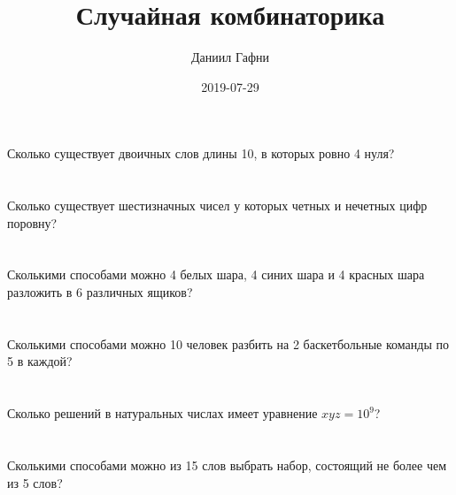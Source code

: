 \documentclass{article}%
\title{Случайная комбинаторика}%
\author{Даниил Гафни}%
\date{2019{-}07{-}29}%
\begin{document}
%
\normalsize%
\maketitle%
\section{}%
\label{sec:}%
Сколько существует двоичных слов длины 10, в которых ровно 4 нуля?%
%
\iffalse%
Автор: Ираклий Гагуа%
Дата: 07{-}01{-}2011%
Название: None%
Подсказка: \textbackslash{}\textbackslash{}%
nan%
\fi

%
\section{}%
\label{sec:}%
Сколько существует шестизначных чисел у которых четных и нечетных цифр
поровну?%
%
\iffalse%
Автор: 25 школа%
Дата: 01{-}07{-}2017%
Название: None%
Подсказка: \textbackslash{}\textbackslash{}%
nan%
\fi

%
\section{}%
\label{sec:}%
Сколькими способами можно 4 белых шара, 4 синих шара и 4 красных шара
разложить в 6 различных ящиков?%
%
\iffalse%
Автор: Дмитрий Трущин%
Дата: 01{-}10{-}2013%
Название: None%
Подсказка: \textbackslash{}\textbackslash{}%
nan%
\fi

%
\section{}%
\label{sec:}%
Сколькими способами можно 10 человек разбить на 2 баскетбольные команды
по 5 в каждой?%
%
\iffalse%
Автор: 25 школа%
Дата: 01{-}07{-}2017%
Название: None%
Подсказка: \textbackslash{}\textbackslash{}%
nan%
\fi

%
\section{}%
\label{sec:}%
Сколько решений в натуральных числах имеет уравнение $x y z=10^{9}$?%
%
\iffalse%
Автор: Дмитрий Трущин%
Дата: 01{-}10{-}2013%
Название: None%
Подсказка: \textbackslash{}\textbackslash{}%
nan%
\fi

%
\section{}%
\label{sec:}%
Сколькими способами можно из 15 слов выбрать набор, состоящий не более чем
из 5 слов?%
%
\iffalse%
Автор: 25 школа%
Дата: 01{-}07{-}2017%
Название: None%
Подсказка: \textbackslash{}\textbackslash{}%
nan%
\fi
\end{document}
